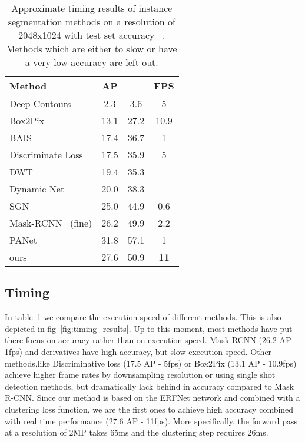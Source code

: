 \begin{table}
    \small
    \centering
    \begin{tabular}{l|c|c|c}
        Method & AP &  & FPS \\
        \hline 
        Deep Contours~\cite{van2016instance}     & 2.3  & 3.6  & 5 \\
        Box2Pix~\cite{uhrig2018box2pix}          & 13.1 & 27.2 & 10.9 \\
        BAIS~\cite{hayder2017boundary}           & 17.4 & 36.7 & 1 \\
        Discriminate Loss~\cite{de2017semantic}  & 17.5 & 35.9 & 5 \\
        DWT~\cite{bai2017deep}                   & 19.4 & 35.3 &  \\
        Dynamic Net~\cite{arnab2017pixelwise}    & 20.0 & 38.3 &  \\
        SGN~\cite{liu2017sgn}                    & 25.0 & 44.9 & 0.6 \\
        Mask-RCNN~\cite{he2017mask} (fine)       & 26.2 & 49.9 & 2.2 \\
        PANet~\cite{liu2018path}                 & 31.8 & 57.1 & 1 \\
        \hline
        ours                                     & 27.6 & 50.9 & \textbf{11} \\
    \end{tabular}
    \vspace{3mm}
    \caption{Approximate timing results of instance segmentation methods on a resolution of 2048x1024 with test set accuracy ~\cite{uhrig2018box2pix}. Methods which are either to slow or have a very low accuracy are left out.}
    \label{tab:timing_results}
\end{table}

\subsection{Timing}
In table~\ref{tab:timing_results} we compare the execution speed of different methods. This is also depicted in fig~\ref{fig:timing_results}. Up to this moment, most methods have put there focus on accuracy rather than on execution speed. Mask-RCNN (26.2 AP - 1fps) and derivatives have high accuracy, but slow execution speed. Other methods,like Discriminative loss (17.5 AP - 5fps) or Box2Pix (13.1 AP - 10.9fps) achieve higher frame rates by downsampling resolution or using single shot detection methods, but dramatically lack behind in accuracy compared to Mask R-CNN. Since our method is based on the ERFNet network and combined with a clustering loss function, we are the first ones to achieve high accuracy  combined with real time performance (27.6 AP - 11fps). More specifically, the forward pass at a resolution of 2MP takes 65ms and the clustering step requires 26ms. 


